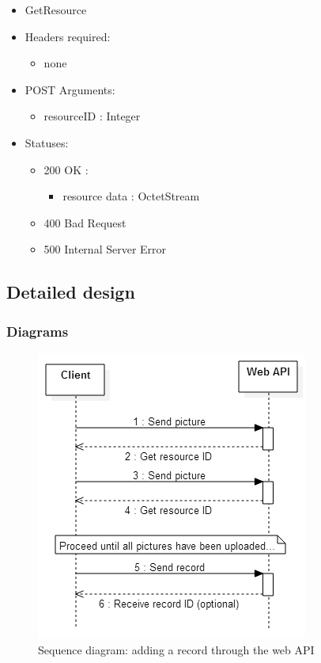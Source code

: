 \begin{itemize}
        \item GetResource
        \item Headers required:
        \begin{itemize}
            \item none
        \end{itemize}
        \item POST Arguments:
        \begin{itemize}
        	\item resourceID : Integer
        \end{itemize}
        \item Statuses:
        \begin{itemize}
        	\item 200 OK : 
            \begin{itemize}
                \item resource data : OctetStream
            \end{itemize}
        	\item 400 Bad Request
        	\item 500 Internal Server Error
        \end{itemize}
    \end{itemize}

\subsection{Detailed design}
    \subsubsection{Diagrams}
        \begin{figure}
            \centering
            \includegraphics[scale=0.75]{server/working/SequenceDiagram-AddRecord.png}
            \caption{Sequence diagram: adding a record through the web API}
            \label{fig:addRecordSequenceDiagram}
        \end{figure}

